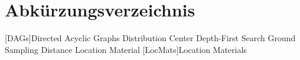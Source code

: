 \chapter*{Abkürzungsverzeichnis}

\begin{acronym}[WYSISWG] %


	[DAGs]{Directed Acyclic Graphs}
	 {Distribution Center}
	 {Depth-First Search}
	 {Ground Sampling Distance}
	 {Location Material}
	[LocMats]{Location Materials}

\end{acronym}
